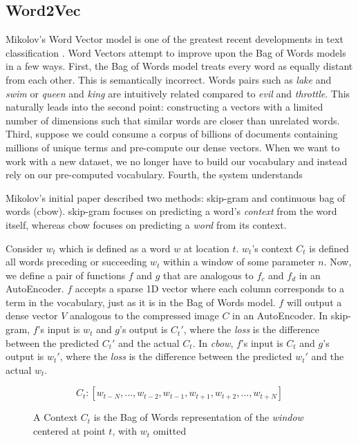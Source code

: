 \subsection{Word2Vec}

\par{
Mikolov's Word Vector model is one of the greatest recent developments in text classification \cite{word2vec}. Word Vectors attempt to improve upon the Bag of Words models in a few ways. First, the Bag of Words model treats every word as equally distant from each other. This is semantically incorrect. Words pairs such as \textit{lake} and \textit{swim} or \textit{queen} and \textit{king} are intuitively related compared to \textit{evil} and \textit{throttle}. This naturally leads into the second point: constructing a vectors with a limited number of dimensions such that similar words are closer than unrelated words. Third, suppose we could consume a corpus of billions of documents containing millions of unique terms and pre-compute our dense vectors. When we want to work with a new dataset, we no longer have to build our vocabulary and instead rely on our pre-computed vocabulary. Fourth, the system understands 
}

\par{
Mikolov's initial paper described two methods: \textsf{skip-gram} and \textsf{continuous bag of words (cbow)}. \textsf{skip-gram} focuses on predicting a word's \textit{context} from the word itself, whereas \textsf{cbow} focuses on predicting a \textit{word} from its context. 
}

\par{
Consider $w_t$ which is defined as a word $w$ at location $t$. $w_t$'s context $C_t$ is defined all words preceding or succeeding $w_t$ within a window of some parameter $n$. Now, we define a pair of functions $f$ and $g$ that are analogous to $f_c$ and $f_d$ in an AutoEncoder. $f$ accepts a sparse 1D vector where each column corresponds to a term in the vocabulary, just as it is in the Bag of Words model. $f$ will output a dense vector $V$ analogous to the compressed image $C$ in an AutoEncoder. In \textsf{skip-gram}, $f$'s input is $w_t$ and $g$'s output is $C_t'$, where the \textit{loss} is the difference between the predicted $C_t'$ and the actual $C_t$. In \textit{cbow}, $f$'s input is $C_t$ and $g$'s output is $w_t'$, where the \textit{loss} is the difference between the predicted $w_t'$ and the actual $w_t$. 
}


\begin{figure}
\[ C_t: [w_{t-N}, ..., w_{t-2}, w_{t-1}, w_{t+1}, w_{t+2}, ..., w_{t+N}] \]
\caption{A Context $C_t$ is the Bag of Words representation of the \textit{window} centered at point $t$, with $w_t$ omitted}
\end{figure}


